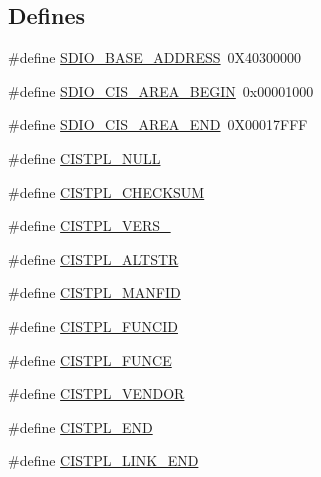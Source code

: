 \subsection*{Defines}
\begin{DoxyCompactItemize}
\item 
\#define \hyperlink{a00584_ae85da24c93589d650ff798c2471a16ca}{SDIO\_\-BASE\_\-ADDRESS}~0X40300000
\item 
\#define \hyperlink{a00584_a3b22f24b4f15dd534965c34cb799bfa7}{SDIO\_\-CIS\_\-AREA\_\-BEGIN}~0x00001000
\item 
\#define \hyperlink{a00584_a71aae0580975b9c963aecd8228dffd90}{SDIO\_\-CIS\_\-AREA\_\-END}~0X00017FFF
\item 
\#define \hyperlink{a00584_a63323d48f25522cf360323ea211adb8f}{CISTPL\_\-NULL}
\item 
\#define \hyperlink{a00584_a8f83e4bdfc4ae662c4a952a307dbfc9d}{CISTPL\_\-CHECKSUM}
\item 
\#define \hyperlink{a00584_a35ce88e01940df49789578a0a8a17d60}{CISTPL\_\-VERS\_}
\item 
\#define \hyperlink{a00584_a371a087a67afaf0ce4f91fd2c46f50af}{CISTPL\_\-ALTSTR}
\item 
\#define \hyperlink{a00584_a254d188fdc3d26e69e7a9cd16801bbb0}{CISTPL\_\-MANFID}
\item 
\#define \hyperlink{a00584_ac0f38d2fc8e1f138fa9c6710d7bd47ae}{CISTPL\_\-FUNCID}
\item 
\#define \hyperlink{a00584_a99af349641e81e3aadae8c3d734bb411}{CISTPL\_\-FUNCE}
\item 
\#define \hyperlink{a00584_a3e176ed7d370976c08e92ec312abc459}{CISTPL\_\-VENDOR}
\item 
\#define \hyperlink{a00584_ab55b15a6e3e612bbf7acf72c959acf83}{CISTPL\_\-END}
\item 
\#define \hyperlink{a00584_ab41c85f42d0e978901276a66d07d1312}{CISTPL\_\-LINK\_\-END}
\end{DoxyCompactItemize}
